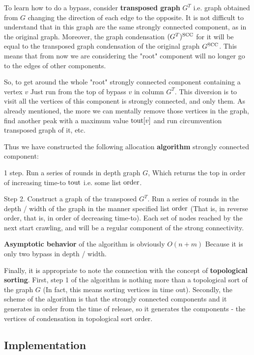 To learn how to do a bypass, consider \textbf{transposed graph} $G ^ T$ i.e. graph obtained from $G$ changing the direction of each edge to the opposite. It is not difficult to understand that in this graph are the same strongly connected component, as in the original graph. Moreover, the graph condensation $(G ^ T) ^ {\rm SCC}$ for it will be equal to the transposed graph condensation of the original graph $G ^ {\rm SCC}$. This means that from now we are considering the "root" component will no longer go to the edges of other components.

So, to get around the whole "root" strongly connected component containing a vertex $v$ Just run from the top of bypass $v$ in column $G ^ T$. This diversion is to visit all the vertices of this component is strongly connected, and only them. As already mentioned, the more we can mentally remove those vertices in the graph, find another peak with a maximum value ${\rm tout} [v]$ and run circumvention transposed graph of it, etc.

Thus we have constructed the following allocation \textbf{algorithm} strongly connected component:

1 step. Run a series of rounds in depth graph $G$, Which returns the top in order of increasing time-to ${\rm tout}$ i.e. some list $\rm order$.

Step 2. Construct a graph of the transposed $G ^ T$. Run a series of rounds in the depth / width of the graph in the manner specified list $\rm order$ (That is, in reverse order, that is, in order of decreasing time-to). Each set of nodes reached by the next start crawling, and will be a regular component of the strong connectivity.

\textbf{Asymptotic behavior} of the algorithm is obviously $O (n + m)$ Because it is only two bypass in depth / width.

Finally, it is appropriate to note the connection with the concept of \textbf{topological sorting}. First, step 1 of the algorithm is nothing more than a topological sort of the graph $G$ (In fact, this means sorting vertices in time out). Secondly, the scheme of the algorithm is that the strongly connected components and it generates in order from the time of release, so it generates the components - the vertices of condensation in topological sort order.

\subsection{ Implementation }

